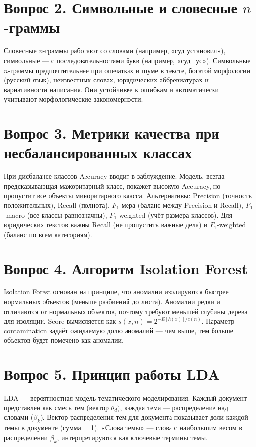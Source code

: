 \documentclass[12pt, a4paper]{report}
\begin{document}
\section{Вопрос 2. Символьные и словесные $n$-граммы}

Словесные $n$-граммы работают со словами (например, «суд установил»), символьные —
с последовательностями букв (например, «суд\_ус»). Символьные $n$-граммы
предпочтительнее при опечатках и шуме в тексте, богатой морфологии (русский язык),
неизвестных словах, юридических аббревиатурах и вариативности написания.
Они устойчивее к ошибкам и автоматически учитывают морфологические закономерности.

\section{Вопрос 3. Метрики качества при несбалансированных классах}

При дисбалансе классов Accuracy вводит в заблуждение. Модель, всегда предсказывающая
мажоритарный класс, покажет высокую Accuracy, но пропустит все объекты миноритарного
класса. Альтернативы: Precision (точность положительных), Recall (полнота),
$F_1$-мера (баланс между Precision и Recall), $F_1$-macro (все классы равнозначны),
$F_1$-weighted (учёт размера классов). Для юридических текстов важны Recall (не
пропустить важные дела) и $F_1$-weighted (баланс по всем категориям).

\section{Вопрос 4. Алгоритм Isolation Forest}

Isolation Forest основан на принципе, что аномалии изолируются быстрее нормальных
объектов (меньше разбиений до листа). Аномалии редки и отличаются от нормальных
объектов, поэтому требуют меньшей глубины дерева для изоляции. Score вычисляется
как $s(x,n) = 2^{-E[h(x)]/c(n)}$. Параметр contamination задаёт ожидаемую долю
аномалий — чем выше, тем больше объектов будет помечено как аномалии.

\section{Вопрос 5. Принцип работы LDA}

LDA — вероятностная модель тематического моделирования. Каждый документ представлен
как смесь тем (вектор $\theta_d$), каждая тема — распределение над словами ($\beta_k$).
Вектор распределения тем для документа показывает доли каждой темы в документе
(сумма = 1). «Слова темы» — слова с наибольшим весом в распределении $\beta_k$,
интерпретируются как ключевые термины темы.
\end{document}
